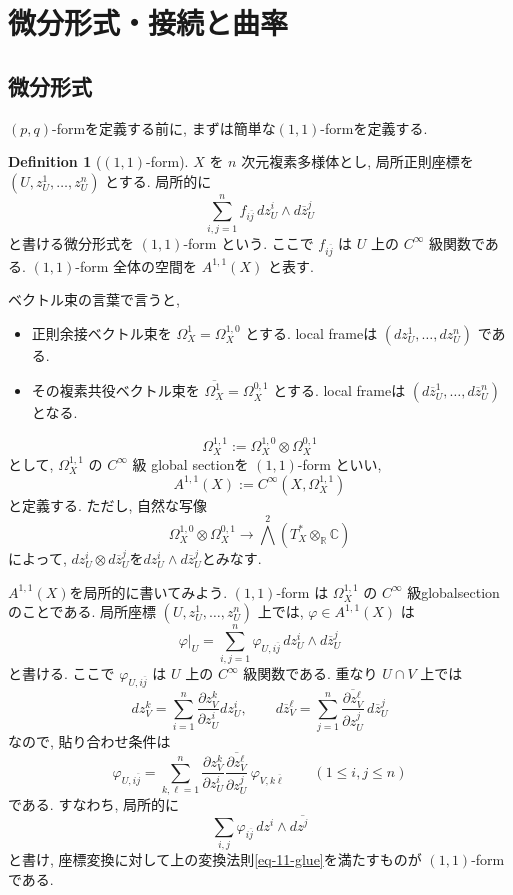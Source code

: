 \documentclass[dvipdfmx,a4paper,11pt]{article} %
\theoremstyle{definition}
\newtheorem{defn}[thm]{Definition}
\theoremstyle{remark}
\numberwithin{equation}{section}
\begin{document}
\newpage

\section{微分形式・接続と曲率}
\label{sec-connection}

\subsection{微分形式}
$(p,q)$-formを定義する前に, まずは簡単な$(1,1)$-formを定義する. 
\begin{defn}[\((1,1)\)-form]
\(X\) を \(n\) 次元複素多様体とし, 局所正則座標を \((U,z_U^1,\ldots,z_U^n)\) とする. 局所的に
\[
\sum_{i,j=1}^{n}
f_{i\overline j}\,
dz_U^i\wedge d\overline{z}_U^j
\]
と書ける微分形式を \((1,1)\)-form という. ここで \(f_{i\overline j}\) は \(U\) 上の \(C^\infty\) 級関数である. \((1,1)\)-form 全体の空間を
\(
A^{1,1}(X)
\)
と表す.

ベクトル束の言葉で言うと,
\begin{itemize}
\item 正則余接ベクトル束を
\(
\Omega_X^1=\Omega_X^{1,0}
\)
とする. local frameは
\(
(dz_U^1,\ldots,dz_U^n)
\)
である. 
\item その複素共役ベクトル束を
\(
\overline{\Omega_X^1}=\Omega_X^{0,1}
\)
とする. local frameは
\(
(d\overline{z}_U^1,\ldots,d\overline{z}_U^n)
\)
となる. 
\end{itemize}
\[
\Omega_X^{1,1}
:=
\Omega_X^{1,0}\otimes \Omega_X^{0,1}
\]
として, 
\(\Omega_X^{1,1}\) の \(C^\infty\) 級 global sectionを \((1,1)\)-form といい, 
\[
A^{1,1}(X)
:=
C^\infty(X,\Omega_X^{1,1})
\]
と定義する. 
ただし, 自然な写像
\[
\Omega_X^{1,0}\otimes \Omega_X^{0,1}
\longrightarrow
\bigwedge^2(T_X^*\otimes_{\mathbb R}\mathbb C)
\]
によって,
\(
dz_U^i\otimes d\overline{z}_U^j
\text{を}
dz_U^i\wedge d\overline{z}_U^j
\text{とみなす.}
\)
\end{defn}

$A^{1,1}(X)$を局所的に書いてみよう. 
\((1,1)\)-form は \(\Omega_X^{1,1}\) の \(C^\infty\) 級globalsectionのことである. 
局所座標 \((U,z_U^1,\ldots,z_U^n)\) 上では, \(\varphi\in A^{1,1}(X)\) は
\[
\varphi|_{U}
=
\sum_{i,j=1}^n
\varphi_{U,i\overline{j}}\,
dz_U^i\wedge d\overline{z}_U^j
\]
と書ける. ここで \(\varphi_{U,i\overline{j}}\) は \(U\) 上の \(C^\infty\) 級関数である. 重なり \(U\cap V\) 上では
\[
dz_V^k
=
\sum_{i=1}^n
\frac{\partial z_V^k}{\partial z_U^i}
dz_U^i,
\qquad
d\overline{z}_V^\ell
=
\sum_{j=1}^n
\overline{\frac{\partial z_V^\ell}{\partial z_U^j}}\,
d\overline{z}_U^j
\]
なので, 貼り合わせ条件は
\begin{equation}
\label{eq-11-glue}
\varphi_{U,i\overline{j}}
=
\sum_{k,\ell=1}^n
\frac{\partial z_V^k}{\partial z_U^i}
\overline{\frac{\partial z_V^\ell}{\partial z_U^j}}\,
\varphi_{V,k\overline{\ell}}
\qquad
(1\leq i,j\leq n)
\end{equation}
である. すなわち, 局所的に
\[
\sum_{i,j}\varphi_{i\overline{j}}\,dz^i\wedge d\overline{z^j}
\]
と書け, 座標変換に対して上の変換法則\eqref{eq-11-glue}を満たすものが \((1,1)\)-form である.
\end{document}
